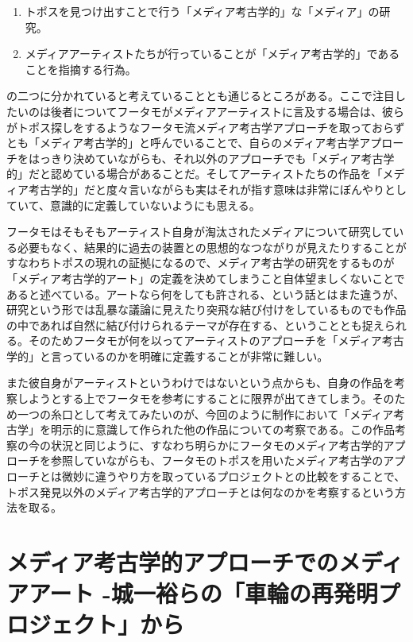 \documentclass[a4paper,report]{jsbook}
\begin{document}
\begin{enumerate}
\def\labelenumi{\arabic{enumi}.}
\tightlist
\item
  トポスを見つけ出すことで行う「メディア考古学的」な「メディア」の研究。
\item
  メディアアーティストたちが行っていることが「メディア考古学的」であることを指摘する行為。
\end{enumerate}

の二つに分かれていると考えていることとも通じるところがある。ここで注目したいのは後者についてフータモがメディアアーティストに言及する場合は、彼らがトポス探しをするようなフータモ流メディア考古学アプローチを取っておらずとも「メディア考古学的」と呼んでいることで、自らのメディア考古学アプローチをはっきり決めていながらも、それ以外のアプローチでも「メディア考古学的」だと認めている場合があることだ。そしてアーティストたちの作品を「メディア考古学的」だと度々言いながらも実はそれが指す意味は非常にぼんやりとしていて、意識的に定義していないようにも思える。

フータモはそもそもアーティスト自身が淘汰されたメディアについて研究している必要もなく、結果的に過去の装置との思想的なつながりが見えたりすることがすなわちトポスの現れの証拠になるので、メディア考古学の研究をするものが「メディア考古学的アート」の定義を決めてしまうこと自体望ましくないことであると述べている。アートなら何をしても許される、という話とはまた違うが、研究という形では乱暴な議論に見えたり突飛な結び付けをしているものでも作品の中であれば自然に結び付けられるテーマが存在する、ということとも捉えられる。そのためフータモが何を以ってアーティストのアプローチを「メディア考古学的」と言っているのかを明確に定義することが非常に難しい。

また彼自身がアーティストというわけではないという点からも、自身の作品を考察しようとする上でフータモを参考にすることに限界が出てきてしまう。そのため一つの糸口として考えてみたいのが、今回のように制作において「メディア考古学」を明示的に意識して作られた他の作品についての考察である。この作品考察の今の状況と同じように、すなわち明らかにフータモのメディア考古学的アプローチを参照していながらも、フータモのトポスを用いたメディア考古学のアプローチとは微妙に違うやり方を取っているプロジェクトとの比較をすることで、トポス発見以外のメディア考古学的アプローチとは何なのかを考察するという方法を取る。

\section{メディア考古学的アプローチでのメディアアート
-城一裕らの「車輪の再発明プロジェクト」から}\label{ux30e1ux30c7ux30a3ux30a2ux8003ux53e4ux5b66ux7684ux30a2ux30d7ux30edux30fcux30c1ux3067ux306eux30e1ux30c7ux30a3ux30a2ux30a2ux30fcux30c8--ux57ceux4e00ux88d5ux3089ux306eux8ecaux8f2aux306eux518dux767aux660eux30d7ux30edux30b8ux30a7ux30afux30c8ux304bux3089}
\end{document}
